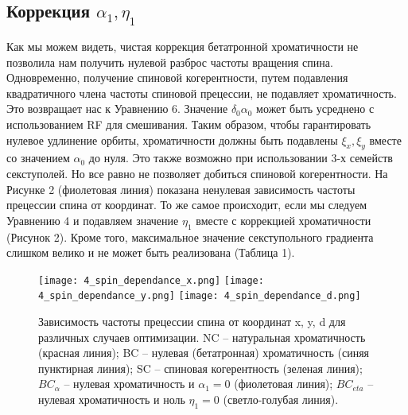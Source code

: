 \subsection{Коррекция $\alpha_{1}, \eta_{1}$}\label{sec:EDM/Wien_filter_tracking/correction}
\par Как мы можем видеть, чистая коррекция бетатронной хроматичности не позволила нам получить нулевой разброс частоты вращения спина. Одновременно, получение спиновой когерентности, путем подавления квадратичного члена частоты спиновой прецессии, не подавляет хроматичность. Это возвращает нас к Уравнению 6. Значение $\delta_0\alpha_0$ может быть усреднено с использованием RF для смешивания. Таким образом, чтобы гарантировать нулевое удлинение орбиты, хроматичности должны быть подавлены $\xi_x,\xi_y$ вместе со значением $\alpha_0$ до нуля. Это также возможно при использовании 3-х семейств секступолей. Но все равно не позволяет добиться спиновой когерентности. На Рисунке 2 (фиолетовая линия) показана ненулевая зависимость частоты прецессии спина от координат. То же самое происходит, если мы следуем Уравнению 4 и подавляем значение $\eta_1$ вместе с коррекцией хроматичности (Рисунок 2). Кроме того, максимальное значение секступольного градиента слишком велико и не может быть реализована (Таблица 1).

\begin{figure}[!h]
  \centering
   \texttt{[image: 4\_spin\_dependance\_x.png]}
   \texttt{[image: 4\_spin\_dependance\_y.png]}
   \texttt{[image: 4\_spin\_dependance\_d.png]}
   \caption{Зависимость частоты прецессии спина от координат x, y, d для различных случаев оптимизации. NC – натуральная хроматичность (красная линия); BC – нулевая (бетатронная) хроматичность (синяя пунктирная линия); SC – спиновая когерентность (зеленая линия); $BC_{\alpha}$ – нулевая хроматичность и $\alpha_1=0$ (фиолетовая линия); $BC_{eta}$ – нулевая хроматичность и ноль $\eta_1=0$ (светло-голубая линия).}
   \label{fig:4_spin_dependance}
\end{figure}


